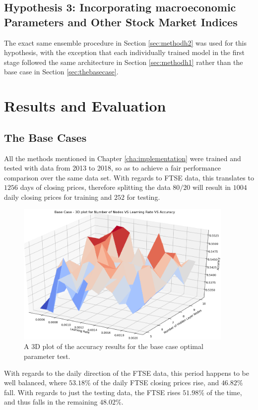 \documentclass{UoYCSproject}
\begin{document}
\section{Hypothesis 3: Incorporating macroeconomic Parameters and Other Stock Market Indices}
\label{sec:methodh3}
The exact same ensemble procedure in Section \ref{sec:methodh2} was used for this hypothesis, with the exception that each individually trained model in the first stage followed the same architecture in Section \ref{sec:methodh1} rather than the base case in Section \ref{sec:thebasecase}. 


\chapter{Results and Evaluation}
\label{cha:resultsandevaluation}
\section{The Base Cases}
All the methods mentioned in Chapter \ref{cha:implementation} were trained and tested with data from 2013 to 2018, so as to achieve a fair performance comparison over the same data set. With regards to FTSE data, this translates to $1256$ days of closing prices, therefore splitting the data $80/20$ will result in $1004$ daily closing prices for training and $252$ for testing.

\begin{figure}[h]
\includegraphics[width=10.5cm]{base_accuracy.png}
\centering
\caption{A 3D plot of the accuracy results for the base case optimal parameter test.} 
\label{fig:base_plot_accuracy}
\end{figure}

With regards to the daily direction of the FTSE data, this period happens to be well balanced, where $53.18$\% of the daily FTSE closing prices rise, and $46.82$\% fall. With regards to just the testing data, the FTSE rises $51.98$\% of the time, and thus falls in the remaining $48.02$\%.
\end{document}
